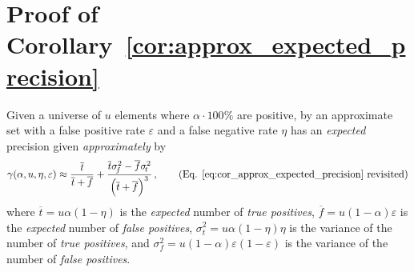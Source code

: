 \documentclass[ ../main.tex]{subfiles}
\begin{document}
\section{Proof of Corollary~\ref{cor:approx_expected_precision}}
\label{sec:proof_approx_expected_precision}
Given a universe of $u$ elements where $\alpha \cdot 100\%$ are positive, by  an approximate set with a false positive rate $\varepsilon$ and a false negative rate $\eta$ has an \emph{expected} precision given \emph{approximately} by
\begin{equation*}
    \gamma(\alpha, u, \eta, \varepsilon) \approx \frac{\overline{t}}{\overline{t} + \overline{f}} +
    \frac{\overline{t} \sigma_{\!f}^2 - \overline{f} \sigma_{\!t}^2}{\left(\overline{t} + \overline{f}\right)^3}\,,
    \tag{Eq. \ref{eq:cor_approx_expected_precision} revisited}
\end{equation*}
where $\overline{t} = u \alpha(1 - \eta)$ is the \emph{expected} number of \emph{true positives}, $\overline{f} =  u(1 - \alpha) \varepsilon$ is the \emph{expected} number of \emph{false positives}, $\sigma_{\!t}^2 = u \alpha (1 - \eta) \eta$ is the variance of the number of \emph{true positives}, and $\sigma_{\!f}^2 = u(1 - \alpha) \varepsilon(1-\varepsilon)$ is the variance of the number of \emph{false positives}.
\end{document}
